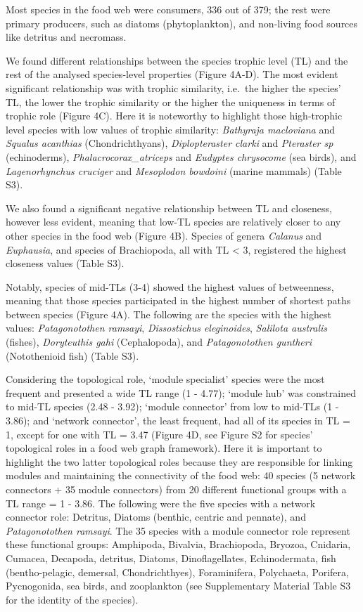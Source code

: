\documentclass[preprint, 3p,
authoryear]{elsarticle} %
\begin{document}
Most species in the food web were consumers, 336 out of 379; the rest
were primary producers, such as diatoms (phytoplankton), and non-living
food sources like detritus and necromass.

We found different relationships between the species trophic level (TL)
and the rest of the analysed species-level properties (Figure 4A-D). The
most evident significant relationship was with trophic similarity,
i.e.~the higher the species' TL, the lower the trophic similarity or the
higher the uniqueness in terms of trophic role (Figure 4C). Here it is
noteworthy to highlight those high-trophic level species with low values
of trophic similarity: \emph{Bathyraja macloviana} and \emph{Squalus
acanthias} (Chondrichthyans), \emph{Diplopteraster clarki} and
\emph{Pteraster sp} (echinoderms), \emph{Phalacrocorax\_atriceps} and
\emph{Eudyptes chrysocome} (sea birds), and \emph{Lagenorhynchus
cruciger} and \emph{Mesoplodon bowdoini} (marine mammals) (Table S3).

We also found a significant negative relationship between TL and
closeness, however less evident, meaning that low-TL species are
relatively closer to any other species in the food web (Figure 4B).
Species of genera \emph{Calanus} and \emph{Euphausia}, and species of
Brachiopoda, all with TL \textless{} 3, registered the highest closeness
values (Table S3).

Notably, species of mid-TLs (3-4) showed the highest values of
betweenness, meaning that those species participated in the highest
number of shortest paths between species (Figure 4A). The following are
the species with the highest values: \emph{Patagonotothen ramsayi},
\emph{Dissostichus eleginoides}, \emph{Salilota australis} (fishes),
\emph{Doryteuthis gahi} (Cephalopoda), and \emph{Patagonotothen
guntheri} (Notothenioid fish) (Table S3).

Considering the topological role, `module specialist' species were the
most frequent and presented a wide TL range (1 - 4.77); `module hub' was
constrained to mid-TL species (2.48 - 3.92); `module connector' from low
to mid-TLs (1 - 3.86); and `network connector', the least frequent, had
all of its species in TL = 1, except for one with TL = 3.47 (Figure 4D,
see Figure S2 for species' topological roles in a food web graph
framework). Here it is important to highlight the two latter topological
roles because they are responsible for linking modules and maintaining
the connectivity of the food web: 40 species (5 network connectors + 35
module connectors) from 20 different functional groups with a TL range =
1 - 3.86. The following were the five species with a network connector
role: Detritus, Diatoms (benthic, centric and pennate), and
\emph{Patagonotothen ramsayi}. The 35 species with a module connector
role represent these functional groups: Amphipoda, Bivalvia,
Brachiopoda, Bryozoa, Cnidaria, Cumacea, Decapoda, detritus, Diatoms,
Dinoflagellates, Echinodermata, fish (bentho-pelagic, demersal,
Chondrichthyes), Foraminifera, Polychaeta, Porifera, Pycnogonida, sea
birds, and zooplankton (see Supplementary Material Table S3 for the
identity of the species).
\end{document}
